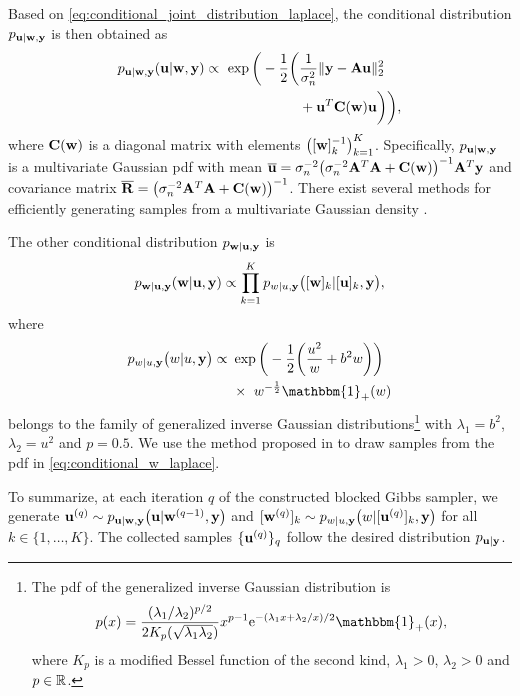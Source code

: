 \documentclass[journal]{IEEEtran}
\begin{document}
Based on \eqref{eq:conditional_joint_distribution_laplace}, the conditional distribution $p_{{\bf{u}} | {\bf{w}}, {\bf{y}}}$ is then obtained as
\begin{align}\label{eq:conditional_u_laplace}
    p_{\M u | \M w, \M y}(\M u | \M w, \M y) \propto \ \exp\bigg(-\frac{1}{2}\bigg(&\frac{1}{\sigma_n^2}\|\M y - \M A \M u\|_{2}^{2} \nonumber \\
    & + \M u^{T} \M C(\M w) \M u \bigg) \bigg),
\end{align}
where ${\bf{C}}({\bf{w}})$ is a diagonal matrix with elements $\big([{\bf{w}}]_k^{-1}\big)_{k=1}^{K}$. Specifically, $p_{{\bf{u}} | {\bf{w}}, {\bf{y}}}$ is a multivariate Gaussian pdf with mean $\overline{{\bf{u}}} = \sigma_n^{-2} \big(\sigma_n^{-2} {\bf{A}}^{T} {\bf{A}} + {\bf{C}}({\bf{w}})\big)^{-1}{\bf{A}}^{T}{\bf{y}}$ and covariance matrix $\overline{{\bf{R}}} = \big(\sigma_n^{-2} {\bf{A}}^{T} {\bf{A}} + {\bf{C}}({\bf{w}})\big)^{-1}$. There exist several methods for efficiently generating samples from a multivariate Gaussian density \cite{rue2001fast,vono2022high}.

The other conditional distribution $p_{{\bf{w}} | {\bf{u}}, {\bf{y}}}$ is
\begin{equation}
    p_{{\bf{w}} | {\bf{u}}, {\bf{y}}}({\bf{w}} | {\bf{u}}, {\bf{y}}) \propto \prod_{k=1}^{K} p_{w|u, {\bf{y}}}\big([{\bf{w}}]_k|[{\bf{u}}]_k, {\bf{y}}\big),
\end{equation}
where
\begin{align}\label{eq:conditional_w_laplace}
    p_{w | u, \M y}\big(w | u, \M y\big) \propto \ &\exp\bigg(-\frac{1}{2}\bigg(\frac{u^2}{w} + b^2 w\bigg)\bigg) \nonumber \\
    &\times \ w^{-\frac{1}{2}} \mathbbm{1}_{+}(w)
\end{align}
belongs to the family of generalized inverse Gaussian distributions\footnote{The pdf of the generalized inverse Gaussian distribution is \begin{equation*} p(x) = \frac{(\lambda_1/\lambda_2)^{p/2}}{2K_p(\sqrt{\lambda_1 \lambda_2})}x^{p-1} \mathrm{e}^{-(\lambda_1 x + \lambda_2/x)/2} \mathbbm{1}_{+}(x), \end{equation*} where $K_p$ is a modified Bessel function of the second kind, $\lambda_1 > 0$, $\lambda_2 > 0$ and $p \in \mathbb{R}$.} with $\lambda_1 = b^2$, $\lambda_2 = u^2$ and $p = 0.5$. We use the method proposed in \cite{devroye2014random} to draw samples from the pdf in \eqref{eq:conditional_w_laplace}.

To summarize, at each iteration $q$ of the constructed blocked Gibbs sampler, we generate ${\bf{u}}^{(q)} \sim p_{{\bf{u}} | {\bf{w}},{\bf{y}}}\big({\bf{u}} | {\bf{w}}^{(q-1)}, {\bf{y}}\big)$ and $[{\bf{w}}^{(q)}]_k \sim p_{w | u,{\bf{y}}}\big(w | [{\bf{u}}^{(q)}]_k,{\bf{y}} \big)$ for all $k\in \{1,\ldots,K\}$. The collected samples $\{{\bf{u}}^{(q)}\}_q$ follow the desired distribution $p_{{\bf{u}} | {\bf{y}}}$.
\end{document}
